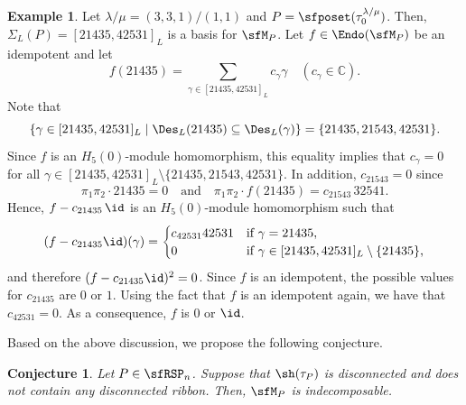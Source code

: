 \documentclass[12pt, reqno]{amsart}
\newtheorem{conjecture}[theorem]{Conjecture}
\theoremstyle{definition}
\newtheorem{example}[theorem]{Example}
\numberwithin{equation}{section} \numberwithin{figure}{section}
\numberwithin{table}{section}
\def\C{\mathbb C}
\begin{document}
\begin{example}\label{eg: disconnected and indecomp}
Let $\lambda/\mu = (3,3,1)/(1,1)$ and $P = \sfposet(\tau_0^{\lambda/\mu})$.
Then, $\Sigma_L(P) = [21435, 42531]_L$ is a basis for $\sfM_P$.
Let $f \in \Endo(\sfM_P)$ be an idempotent  and let $$
f(21435) = \sum_{\gamma \in [21435, 42531]_L} c_\gamma \gamma \quad (c_\gamma \in \C).
$$
Note that 
$$
\{\gamma \in [21435, 42531]_L \mid \Des_L(21435) \subseteq \Des_L(\gamma) \} = \{21435, 21543, 42531\}.
$$
Since $f$ is an $H_5(0)$-module homomorphism, 
this equality 
implies that 
 $c_\gamma = 0$ for all $\gamma \in [21435, 42531]_L \setminus \{21435,21543,42531\}$.
In addition, $c_{21543} = 0$ since 
$$
\pi_1 \pi_2 \cdot 21435 = 0 \quad \text{and} \quad
\pi_1 \pi_2 \cdot f(21435) =  c_{21543} \, 32541.
$$
Hence, $f - c_{21435} \, \id$ is an $H_5(0)$-module homomorphism such that 
\[
(f - c_{21435} \id) (\gamma) = \begin{cases}
c_{42531} 42531 & \text{if $\gamma = 21435$},\\
0 & \text{if $\gamma \in [21435, 42531]_L \setminus \{21435\}$,}
\end{cases}
\]
and therefore $(f - c_{21435} \id)^2 = 0$.
Since $f$ is an idempotent, the possible values for $c_{21435}$ are $0$ or $1$.
Using the fact that $f$ is an idempotent again, we have that $c_{42531} = 0$.
As a consequence, $f$ is $0$ or $\id$.
\end{example}

Based on the above discussion, we propose the following conjecture.


\begin{conjecture}\label{conj: on indecomp}
Let $P \in \sfRSP_n$.
Suppose that $\sh(\tau_P)$ is disconnected and does not contain any disconnected ribbon.
Then,  $\sfM_P$ is indecomposable.
\end{conjecture}
\end{document}
